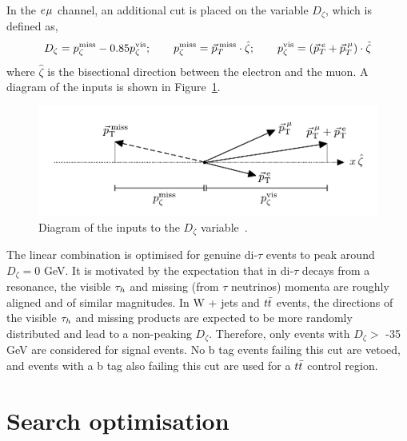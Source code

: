 In the $e_{}\mu_{}$ channel, an additional cut is placed on the variable $D_{\zeta}$, which is defined as,
\begin{equation}
D_\zeta = p_\zeta^\text{miss} - 0.85 p_\zeta^\text{vis};\qquad
p_\zeta^\text{miss} = \vec{p}_{T}^{\hspace{2pt}\text{miss}} \cdot \hat{\zeta};\qquad
p_\zeta^\text{vis} = (\vec{p}_{T}^{\hspace{2pt}e} + \vec{p}_{T}^{\hspace{2pt}\mu}) \cdot \hat{\zeta}
\label{eqn:Dzeta_def}
\end{equation}
where $\hat{\zeta}$ is the bisectional direction between the electron and the muon.
A diagram of the inputs is shown in Figure~\ref{fig:dzeta_diagram}. \\
\begin{figure}[!hbtp]
\centering
    \includegraphics[width=1.0\textwidth]{Figures/dzeta_diagram.pdf}
\caption[Diagram of the inputs to the $D_\zeta$ variable.]{Diagram of the inputs to the $D_\zeta$ variable~\cite{CMS:2022rbd}.}
\label{fig:dzeta_diagram}
\end{figure}

The linear combination is optimised for genuine di-$\tau$ events to peak around $D_{\zeta} = 0$ GeV. 
It is motivated by the expectation that in di-$\tau$ decays from a resonance, the visible $\tau_{h}$ and missing (from $\tau$ neutrinos) momenta are roughly aligned and of similar magnitudes.
In W + jets and $t\bar{t}$ events, the directions of the visible $\tau_{h}$ and missing products are expected to be more randomly distributed and lead to a non-peaking $D_{\zeta}$.
Therefore, only events with $D_\zeta >$ -35 GeV are considered for signal events.
No b tag events failing this cut are vetoed, and events with a b tag also failing this cut are used for a $t\bar{t}$ control region.

\section{Search optimisation}
\label{sec:search_optimisation}

